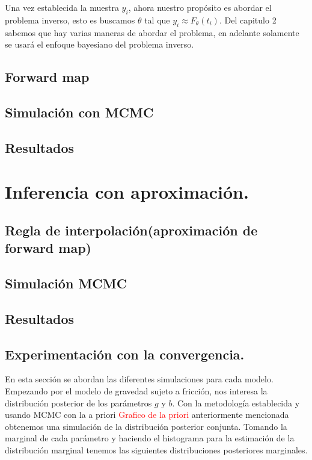 Una vez establecida la muestra $y_i$, ahora nuestro propósito es abordar el problema inverso, esto es buscamos $\theta$ tal que $y_i \approx F_{\theta}(t_i)$. Del capitulo 2 sabemos que hay varias maneras de abordar el problema, en adelante solamente se usará el enfoque bayesiano del problema inverso.


\subsection{Forward map}
\subsection{Simulación con MCMC}
\subsection{Resultados}

\section{Inferencia con aproximación.}

\subsection{Regla de interpolación(aproximación de forward map)}
\subsection{Simulación MCMC}
\subsection{Resultados}

\newpage

\subsection{Experimentación con la convergencia.}

En esta sección se abordan las diferentes simulaciones para cada modelo. Empezando por el modelo de gravedad sujeto a fricción, nos interesa la distribución posterior de los parámetros $g$ y $b$. Con la metodología establecida y usando MCMC con la a priori \textcolor{red}{Grafico de la priori} anteriormente mencionada obtenemos una simulación de la distribución posterior conjunta. Tomando la marginal de cada parámetro y haciendo el histograma para la estimación de la distribución marginal tenemos las siguientes distribuciones posteriores marginales.


